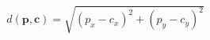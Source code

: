 \documentclass[preview]{standalone}
\begin{document}
\begin{align*}
d(\mathbf{p}, \mathbf{c}) = \sqrt{(p_x - c_x)^2 + (p_y - c_y)^2}
\end{align*}
\end{document}
